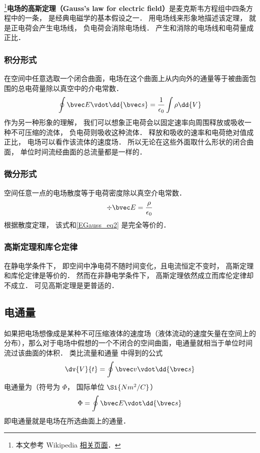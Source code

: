 

\footnote{本文参考 Wikipedia \href{https://en.wikipedia.org/wiki/Gauss's_law}{相关页面}．}\textbf{电场的高斯定理（Gauss's law for electric field）}是麦克斯韦方程组中四条方程中的一条， 是经典电磁学的基本假设之一． 用电场线来形象地描述该定理， 就是正电荷会产生电场线， 负电荷会消除电场线． 产生和消除的电场线和电荷量成正比．

\subsubsection{积分形式}
在空间中任意选取一个闭合曲面，电场在这个曲面上从内向外的通量等于被曲面包围的总电荷量除以真空中的介电常数．
\begin{equation}\label{EGauss_eq2}
\oint \bvec E \vdot \dd{\bvec s} = \frac{1}{\epsilon_0} \int \rho \dd{V}
\end{equation}
作为另一种形象的理解， 我们可以想象正电荷会以固定速率向周围释放或吸收一种不可压缩的流体， 负电荷则吸收这种流体． 释放和吸收的速率和电荷绝对值成正比， 电场可以看作该流体的速度场． 所以无论在这些外面取什么形状的闭合曲面， 单位时间流经曲面的总流量都是一样的．

\subsubsection{微分形式}
空间任意一点的电场散度等于电荷密度除以真空介电常数．
\begin{equation}\label{EGauss_eq1}
\div \bvec E = \frac{\rho}{\epsilon_0}
\end{equation}
根据散度定理， 该式和\autoref{EGauss_eq2} 是完全等价的．

\subsubsection{高斯定理和库仑定律}
在静电学条件下， 即空间中净电荷不随时间变化，且电流恒定不变时， 高斯定理和库伦定律是等价的． 然而在非静电学条件下， 高斯定理依然成立而库伦定律却不成立． 可见高斯定理是更普适的．

\subsection{电通量}
如果把电场想像成是某种不可压缩液体的速度场（液体流动的速度矢量在空间上的分布），那么对于电场中假想的一个不闭合的空间曲面，电通量就相当于单位时间流过该曲面的体积．
类比流量和通量%
中得到的公式
\begin{equation}
\dv{V}{t} = \oint \bvec v \vdot \dd{\bvec s}
\end{equation} 
电通量为（符号为 $\Phi $， 国际单位 $\Si{N m^2/C}$）
\begin{equation}
\Phi  = \oint \bvec E \vdot \dd{\bvec s}
\end{equation} 
即电通量就是电场在所选曲面上的通量．

